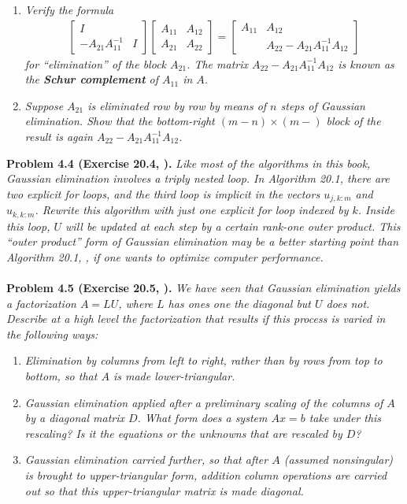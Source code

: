 \documentclass[a4paper,oneside]{book}
\numberwithin{equation}{chapter}
\begin{document}
\begin{enumerate}
\item \textit{Verify the formula}
\begin{align}
\left[ {\begin{array}{*{20}{c}}
I&{}\\
{ - {A_{21}}A_{11}^{ - 1}}&I
\end{array}} \right]\left[ {\begin{array}{*{20}{c}}
{{A_{11}}}&{{A_{12}}}\\
{{A_{21}}}&{{A_{22}}}
\end{array}} \right] = \left[ {\begin{array}{*{20}{c}}
{{A_{11}}}&{{A_{12}}}\\
{}&{{A_{22}} - {A_{21}}A_{11}^{ - 1}{A_{12}}}
\end{array}} \right]
\end{align}
\textit{for ``elimination'' of the block $A_{21}$. The matrix ${{A_{22}} - {A_{21}}A_{11}^{ - 1}{A_{12}}}$ is known as the \textbf{Schur complement} of $A_{11}$ in $A$.}
\item \textit{Suppose $A_{21}$ is eliminated row by row by means of $n$ steps of Gaussian elimination. Show that the bottom-right $\left(m-n\right)\times\left(m-\right)$ block of the result is again ${{A_{22}} - {A_{21}}A_{11}^{ - 1}{A_{12}}}$.}
\end{enumerate}
\textbf{Problem 4.4 (Exercise 20.4, \cite{1}).} \textit{Like most of the algorithms in this book, Gaussian elimination involves a triply nested loop. In Algorithm 20.1, there are two explicit for loops, and the third loop is implicit in the vectors $u_{j,k:m}$ and $u_{k,k:m}$. Rewrite this algorithm with just one explicit for loop indexed by $k$. Inside this loop, $U$ will be updated at each step by a certain rank-one outer product. This ``outer product'' form of Gaussian elimination may be a better starting point than Algorithm 20.1, \cite{1}, if one wants to optimize computer performance.}\\
\\
\textbf{Problem 4.5 (Exercise 20.5, \cite{1}).} \textit{We have seen that Gaussian elimination yields a factorization $A=LU$, where $L$ has ones one the diagonal but $U$ does not. Describe at a high level the factorization that results if this process is varied in the following ways:}
\begin{enumerate}
\item \textit{Elimination by columns from left to right, rather than by rows from top to bottom, so that $A$ is made lower-triangular.}
\item \textit{Gaussian elimination applied after a preliminary scaling of the columns of $A$ by a diagonal matrix $D$. What form does a system $Ax=b$ take under this rescaling? Is it the equations or the unknowns that are rescaled by $D$?}
\item \textit{Gaussian elimination carried further, so that after $A$ (assumed nonsingular) is brought to upper-triangular form, addition column operations are carried out so that this upper-triangular matrix is made diagonal.}
\end{enumerate}
\end{document}
